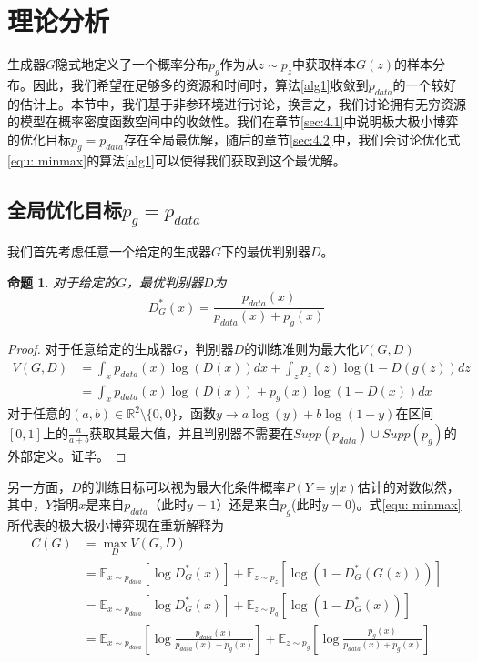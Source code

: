 \documentclass[UTF8]{ctexart}
\newtheorem{proposition}{命题}[section]
\newtheorem{proof}{证明}[section]
\begin{document}
\section{理论分析}
生成器$G$隐式地定义了一个概率分布$p_g$作为从$z\sim p_z$中获取样本$G(z)$的样本分布。因此，我们希望在足够多的资源和时间时，算法\ref{alg1}收敛到$p_{data}$的一个较好的估计上。本节中，我们基于非参环境进行讨论，换言之，我们讨论拥有无穷资源的模型在概率密度函数空间中的收敛性。我们在章节\ref{sec:4.1}中说明极大极小博弈的优化目标$p_g=p_{data}$存在全局最优解，随后的章节\ref{sec:4.2}中，我们会讨论优化式\eqref{equ: minmax}的算法\ref{alg1}可以使得我们获取到这个最优解。

\subsection{全局优化目标$p_g = p_{data}$\label{sec:4.1}}
我们首先考虑任意一个给定的生成器$G$下的最优判别器$D$。
\begin{proposition}
对于给定的$G$，最优判别器$D$为
\begin{equation}
D^*_G(x)=\frac{p_{data}(x)}{p_{data}(x) + p_g(x)} \label{equ:Optimal}
\end{equation}
\end{proposition}
\begin{proof}
对于任意给定的生成器$G$，判别器$D$的训练准则为最大化$V(G, D)$
\begin{equation}
\begin{split}
V(G, D) &= \int_x p_{data}(x)\log(D(x))dx + \int_z p_z(z)\log(1 - D(g(z))dz\\
&= \int_x p_{data}(x)\log(D(x)) + p_g(x)\log(1 - D(x))dx
\end{split}
\end{equation}
对于任意的$(a, b)\in \mathbb{R}^2 \setminus \{0, 0\}$，函数$y \rightarrow a\log(y) + b\log(1-y)$在区间$[0, 1]$上的$\frac{a}{a+b}$获取其最大值，并且判别器不需要在$Supp(p_{data}) \cup Supp(p_g)$的外部定义。证毕。
\end{proof}

另一方面，$D$的训练目标可以视为最大化条件概率$P(Y=y|x)$估计的对数似然，其中，$Y$指明$x$是来自$p_{data}$（此时$y=1$）还是来自$p_g$(此时$y=0$)。式\eqref{equ: minmax}所代表的极大极小博弈现在重新解释为
\begin{equation}\label{equ:CG}
\begin{split}
C(G) &= \max\limits_D V(G, D)\\
&= \mathbb{E}_{x\sim p_{data}}[\log D_G^*(x)] + \mathbb{E}_{z\sim p_z}[\log(1 - D_G^*(G(z)))]\\
&=\mathbb{E}_{x\sim p_{data}}[\log D_G^*(x)] + \mathbb{E}_{z\sim p_g}[\log(1 - D_G^*(x))]\\
&=\mathbb{E}_{x\sim p_{data}}[\log \frac{p_{data}(x)}{p_{data}(x) + p_g(x)}] + \mathbb{E}_{z\sim p_g}[\log\frac{p_g(x)}{p_{data}(x) + p_g(x)}]
\end{split}
\end{equation}
\end{document}

